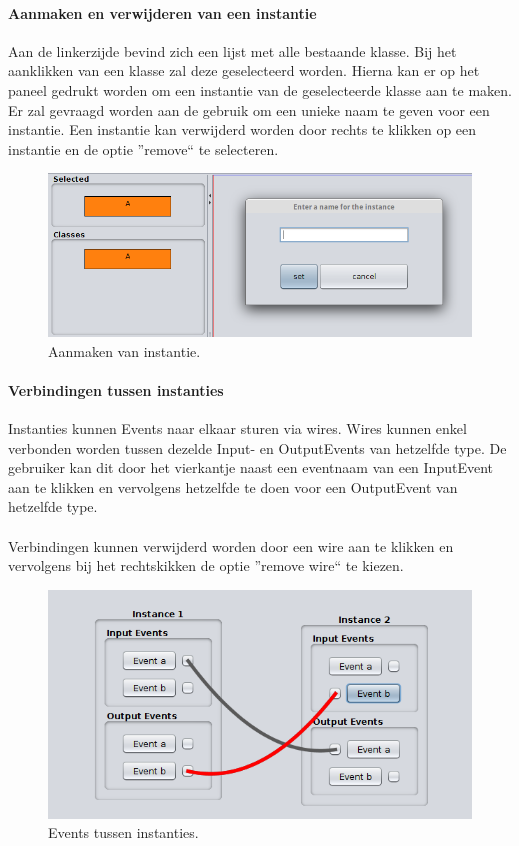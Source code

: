 \documentclass[]{article}
\begin{document}
\paragraph{Aanmaken en verwijderen van een instantie}
Aan de linkerzijde bevind zich een lijst met alle bestaande klasse. Bij het aanklikken van een klasse zal deze geselecteerd worden. Hierna kan er op het paneel gedrukt worden om een instantie van de geselecteerde klasse aan te maken. Er zal gevraagd worden aan de gebruik om een unieke naam te geven voor een instantie. Een instantie kan verwijderd worden door rechts te klikken op een instantie en de optie ''remove`` te selecteren.
\begin{figure}[H]
  \centering
\includegraphics[scale=0.4]{Documentatie/images/makeinstance}
  \caption{Aanmaken van instantie.} \label{instanceCreation}
\end{figure}
\paragraph{Verbindingen tussen instanties}
Instanties kunnen Events naar elkaar sturen via wires. Wires kunnen enkel verbonden worden tussen dezelde Input- en OutputEvents van hetzelfde type. De gebruiker kan dit door het vierkantje naast een eventnaam van een InputEvent aan te klikken en vervolgens hetzelfde te doen voor een OutputEvent van hetzelfde type.\\\\
Verbindingen kunnen verwijderd worden door een wire aan te klikken en vervolgens bij het rechtskikken de optie ''remove wire`` te kiezen.
\begin{figure}[H]
  \centering
\includegraphics[scale=0.5]{Documentatie/images/wires}
  \caption{Events tussen instanties.} \label{wiresdoc}
\end{figure}
\end{document}
